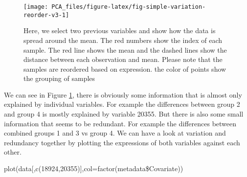 \documentclass[
]{book}
\newenvironment{Shaded}{\begin{snugshade}}{\end{snugshade}}
\newcommand{\CommentTok}[1]{\textcolor[rgb]{0.56,0.35,0.01}{\textit{#1}}}
\newcommand{\ControlFlowTok}[1]{\textcolor[rgb]{0.13,0.29,0.53}{\textbf{#1}}}
\newcommand{\DataTypeTok}[1]{\textcolor[rgb]{0.13,0.29,0.53}{#1}}
\newcommand{\DecValTok}[1]{\textcolor[rgb]{0.00,0.00,0.81}{#1}}
\newcommand{\KeywordTok}[1]{\textcolor[rgb]{0.13,0.29,0.53}{\textbf{#1}}}
\newcommand{\NormalTok}[1]{#1}
\newcommand{\OperatorTok}[1]{\textcolor[rgb]{0.81,0.36,0.00}{\textbf{#1}}}
\newcommand{\StringTok}[1]{\textcolor[rgb]{0.31,0.60,0.02}{#1}}
\theoremstyle{definition}
\theoremstyle{definition}
\theoremstyle{definition}
\theoremstyle{remark}
\begin{document}
\begin{Shaded}
\end{Shaded}

\begin{figure}

{\centering \texttt{[image: PCA\_files/figure-latex/fig-simple-variation-reorder-v3-1]} 

}

\caption{Here, we select two previous variables and show how the data is spread around the mean. The red numbers show the index of each sample. The red line shows the mean and the dashed lines show the distance between each observation and mean. Please note that the samples are reordered based on expression. the color of points show the grouping of samples}\label{fig:fig-simple-variation-reorder-v3}
\end{figure}

We can see in Figure \ref{fig:fig-simple-variation-reorder-v3}, there is obviously some information that is almost only explained by individual variables. For example the differences between group 2 and group 4 is mostly explained by variable 20355. But there is also some small information that seems to be redundant. For example the differences between combined groups 1 and 3 vs group 4. We can have a look at variation and redundancy together by plotting the expressions of both variables against each other.

plot(data{[},c(18924,20355){]},col=factor(metadata\$Covariate))
\end{document}
